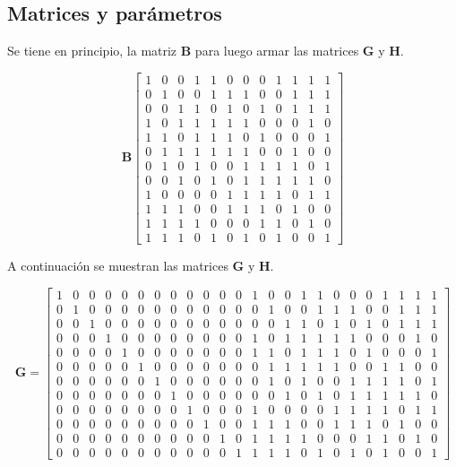 \subsection{Matrices y parámetros}

Se tiene en principio, la matriz \textbf{B} para luego armar las matrices \textbf{G} y \textbf{H}.


\[ \mathbf{B}
\left[
\begin{array}{cccccccccccc}
1&0&0&1&1&0&0&0&1&1&1&1 \\
0&1&0&0&1&1&1&0&0&1&1&1 \\
0&0&1&1&0&1&0&1&0&1&1&1 \\
1&0&1&1&1&1&1&0&0&0&1&0 \\
1&1&0&1&1&1&0&1&0&0&0&1 \\
0&1&1&1&1&1&1&0&0&1&0&0 \\
0&1&0&1&0&0&1&1&1&1&0&1 \\
0&0&1&0&1&0&1&1&1&1&1&0 \\
1&0&0&0&0&1&1&1&1&0&1&1 \\
1&1&1&0&0&1&1&1&0&1&0&0 \\
1&1&1&1&0&0&0&1&1&0&1&0 \\
1&1&1&0&1&0&1&0&1&0&0&1
\end{array}\right]
\]

A continuación se muestran las matrices \textbf{G} y \textbf{H}.

\[
\mathbf{G} =
\left[
\begin{array}{cccccccccccc|cccccccccccc}
1&0&0&0&0&0&0&0&0&0&0&0&
1&0&0&1&1&0&0&0&1&1&1&1\\
0&1&0&0&0&0&0&0&0&0&0&0&
0&1&0&0&1&1&1&0&0&1&1&1\\
0&0&1&0&0&0&0&0&0&0&0&0&
0&0&1&1&0&1&0&1&0&1&1&1\\
0&0&0&1&0&0&0&0&0&0&0&0&
1&0&1&1&1&1&1&0&0&0&1&0\\
0&0&0&0&1&0&0&0&0&0&0&0&
1&1&0&1&1&1&0&1&0&0&0&1\\
0&0&0&0&0&1&0&0&0&0&0&0&
0&1&1&1&1&1&0&0&1&1&0&0\\
0&0&0&0&0&0&1&0&0&0&0&0&
0&1&0&1&0&0&1&1&1&1&0&1\\
0&0&0&0&0&0&0&1&0&0&0&0&
0&0&1&0&1&0&1&1&1&1&1&0\\
0&0&0&0&0&0&0&0&1&0&0&0&
1&0&0&0&0&1&1&1&1&0&1&1\\
0&0&0&0&0&0&0&0&0&1&0&0&
1&1&1&0&0&1&1&1&0&1&0&0\\
0&0&0&0&0&0&0&0&0&0&1&0&
1&1&1&1&0&0&0&1&1&0&1&0\\
0&0&0&0&0&0&0&0&0&0&0&1&
1&1&1&0&1&0&1&0&1&0&0&1
\end{array}
\right]
\]

